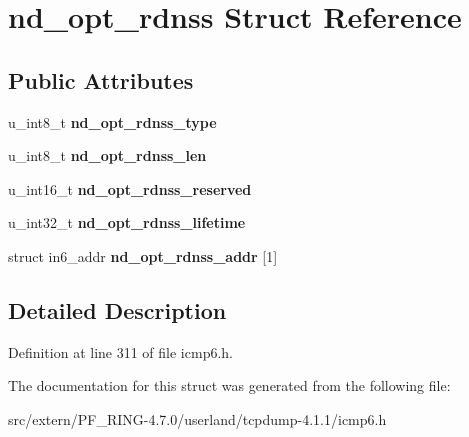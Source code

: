 \hypertarget{structnd__opt__rdnss}{
\section{nd\_\-opt\_\-rdnss Struct Reference}
\label{structnd__opt__rdnss}
}
\subsection*{Public Attributes}
\begin{DoxyCompactItemize}
\item 
\hypertarget{structnd__opt__rdnss_a1f1927c664b5e22552725e55aa3b5ff2}{
u\_\-int8\_\-t {\bfseries nd\_\-opt\_\-rdnss\_\-type}}
\label{structnd__opt__rdnss_a1f1927c664b5e22552725e55aa3b5ff2}

\item 
\hypertarget{structnd__opt__rdnss_a06d25f3b08a743db616b544ae386a8d3}{
u\_\-int8\_\-t {\bfseries nd\_\-opt\_\-rdnss\_\-len}}
\label{structnd__opt__rdnss_a06d25f3b08a743db616b544ae386a8d3}

\item 
\hypertarget{structnd__opt__rdnss_ab226b9f0bc8915db114c1fe6001a0583}{
u\_\-int16\_\-t {\bfseries nd\_\-opt\_\-rdnss\_\-reserved}}
\label{structnd__opt__rdnss_ab226b9f0bc8915db114c1fe6001a0583}

\item 
\hypertarget{structnd__opt__rdnss_a4b5771b7c5bec8d97fe2117f678e191a}{
u\_\-int32\_\-t {\bfseries nd\_\-opt\_\-rdnss\_\-lifetime}}
\label{structnd__opt__rdnss_a4b5771b7c5bec8d97fe2117f678e191a}

\item 
\hypertarget{structnd__opt__rdnss_add1815e8ee3ed2e93876618e4702b940}{
struct in6\_\-addr {\bfseries nd\_\-opt\_\-rdnss\_\-addr} \mbox{[}1\mbox{]}}
\label{structnd__opt__rdnss_add1815e8ee3ed2e93876618e4702b940}

\end{DoxyCompactItemize}


\subsection{Detailed Description}


Definition at line 311 of file icmp6.h.



The documentation for this struct was generated from the following file:\begin{DoxyCompactItemize}
\item 
src/extern/PF\_\-RING-\/4.7.0/userland/tcpdump-\/4.1.1/icmp6.h\end{DoxyCompactItemize}
